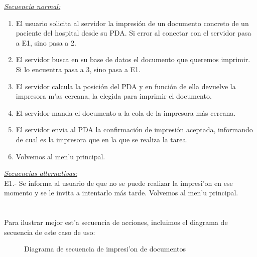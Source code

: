 \emph{\underline{Secuencia normal:}} 
\begin{enumerate}
\item El usuario solicita al servidor la impresi\'on de un documento concreto de un paciente del hospital desde su PDA. Si error al conectar con el servidor pasa a E1, sino pasa a 2.
\item El servidor busca en su base de datos el documento que queremos imprimir. Si lo encuentra pasa a 3, sino pasa a E1.
\item El servidor calcula la posici\'on del PDA y en funci\'on de ella devuelve la impresora m'as cercana,  la elegida para imprimir el documento.
\item El servidor manda el documento a la cola de la impresora m\'as cercana.
\item El servidor envia al PDA la confirmaci\'on de impresi\'on aceptada, informando de cual es la impresora que en la que se realiza la tarea.
\item Volvemos al men'u principal.
\end{enumerate}

\emph{\underline{Secuencias alternativas:}}\\

E1.- Se informa al usuario de que no se puede realizar la impresi'on en ese momento y se le invita a intentarlo m\'as tarde. Volvemos al men'u principal.\\\\
\\

Para ilustrar mejor est'a secuencia de acciones, incluimos el diagrama de secuencia de este caso de uso:\\

\begin{figure}[h!]
	\begin{center}
     	\end{center}
    	\caption{Diagrama de secuencia de impresi'on de documentos}\label{fig:cu_imprimir}
\end{figure}